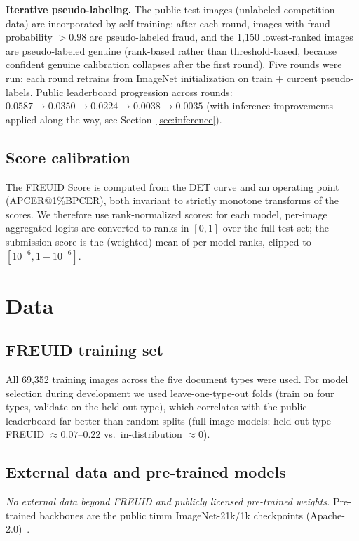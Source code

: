 \documentclass[11pt,a4paper]{article}
\begin{document}
\textbf{Iterative pseudo-labeling.} The public test images (unlabeled competition
data) are incorporated by self-training: after each round, images with fraud
probability $>0.98$ are pseudo-labeled fraud, and the 1{,}150 lowest-ranked images are
pseudo-labeled genuine (rank-based rather than threshold-based, because confident
genuine calibration collapses after the first round). Five rounds were run; each round
retrains from ImageNet initialization on train + current pseudo-labels. Public
leaderboard progression across rounds: $0.0587 \rightarrow 0.0350 \rightarrow 0.0224
\rightarrow 0.0038 \rightarrow 0.0035$ (with inference improvements applied along the
way, see Section~\ref{sec:inference}).

\subsection{Score calibration}
The FREUID Score is computed from the DET curve and an operating point
(APCER@1\%BPCER), both invariant to strictly monotone transforms of the scores.
We therefore use rank-normalized scores: for each model, per-image aggregated logits
are converted to ranks in $[0,1]$ over the full test set; the submission score is the
(weighted) mean of per-model ranks, clipped to $[10^{-6}, 1-10^{-6}]$.

\section{Data}
\label{sec:data}

\subsection{FREUID training set}
All 69{,}352 training images across the five document types were used. For model
selection during development we used leave-one-type-out folds (train on four types,
validate on the held-out type), which correlates with the public leaderboard far
better than random splits (full-image models: held-out-type FREUID $\approx 0.07$--$0.22$
vs.\ in-distribution $\approx 0$).

\subsection{External data and pre-trained models}
\emph{No external data beyond FREUID and publicly licensed pre-trained weights.}
Pre-trained backbones are the public timm ImageNet-21k/1k checkpoints
(Apache-2.0)~\cite{timm}.
\end{document}

